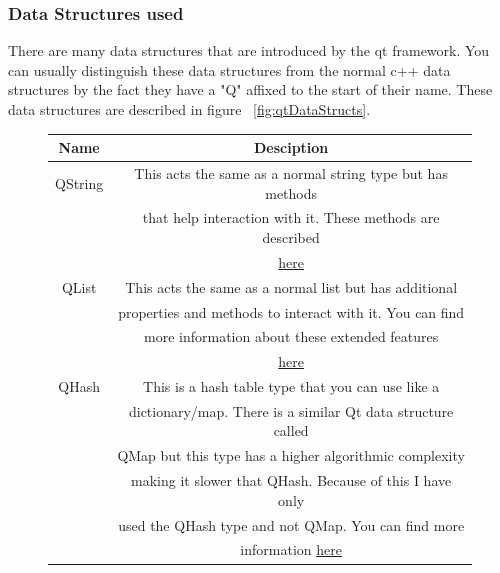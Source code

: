 \documentclass{article}
\begin{document}
\subsubsection{Data Structures used}
There are many data structures that are introduced by the qt framework. You can usually distinguish
these data structures from the normal c++ data structures by the fact they have a "Q" affixed to
the start of their name. These data structures are described in figure ~\ref{fig:qtDataStructs}.
\begin{figure}[H]
    \begin{center}
        \begin{tabular} {| c | c |}
            \hline
            \textbf{Name}        &         \textbf{Desciption}                               \\ \hline
            QString              &This acts the same as a normal string type but has methods \\
                                 &that help interaction with it. These methods are described  \\
                                 &\href{https://doc.qt.io/qt-5/qstring.html}{here}           \\ \hline
            QList                &This acts the same as a normal list but has additional     \\
                                 &properties and methods to interact with it. You can find   \\
                                 &more information about these extended features             \\
                                 &\href{https://doc.qt.io/qt-5/qlist.html}{here}             \\ \hline
            QHash                &This is a hash table type that you can use like a          \\
                                 &dictionary/map. There is a similar Qt data structure called\\
                                 &QMap but this type has a higher algorithmic complexity     \\
                                 &making it slower that QHash. Because of this I have only   \\
                                 &used the QHash type and not QMap. You can find more        \\
                                 &information \href{https://doc.qt.io/qt-5/qhash.html}{here} \\ \hline

\end{tabular}
\end{center}
\end{figure}
\end{document}
